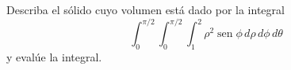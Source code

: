 \item Describa el sólido cuyo volumen está dado por la integral
\[ \int_0^{\pi/2} \int_0^{\pi/2} \int_1^2 \rho^2 \operatorname{sen} \phi \, d\rho \, d\phi \, d\theta \]
y evalúe la integral.
